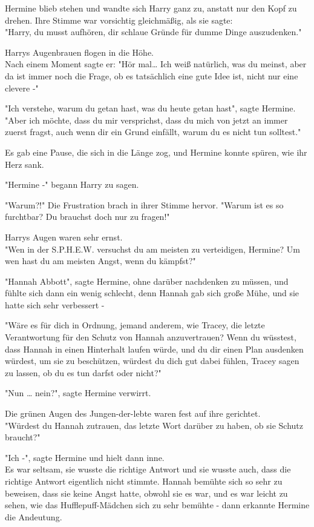 {Hermine blieb stehen und wandte sich Harry ganz zu, anstatt nur den Kopf zu drehen. Ihre Stimme war vorsichtig gleichmäßig, als sie sagte:\\ "Harry, du musst aufhören, dir schlaue Gründe für dumme Dinge auszudenken."

Harrys Augenbrauen flogen in die Höhe.\\ Nach einem Moment sagte er: "Hör mal… Ich weiß natürlich, was du meinst, aber da ist immer noch die Frage, ob es tatsächlich eine gute Idee ist, nicht nur eine clevere -"

"Ich verstehe, warum du getan hast, was du heute getan hast", sagte Hermine. "Aber ich möchte, dass du mir versprichst, dass du mich von jetzt an immer zuerst fragst, auch wenn dir ein Grund einfällt, warum du es nicht tun solltest."

Es gab eine Pause, die sich in die Länge zog, und Hermine konnte spüren, wie ihr Herz sank.

"Hermine -" begann Harry zu sagen.

"Warum?!" Die Frustration brach in ihrer Stimme hervor. "Warum ist es so furchtbar? Du brauchst doch nur zu fragen!"

Harrys Augen waren sehr ernst.\\ "Wen in der S.P.H.E.W. versuchst du am meisten zu verteidigen, Hermine? Um wen hast du am meisten Angst, wenn du kämpfst?"

"Hannah Abbott", sagte Hermine, ohne darüber nachdenken zu müssen, und fühlte sich dann ein wenig schlecht, denn Hannah gab sich große Mühe, und sie hatte sich sehr verbessert -

"Wäre es für dich in Ordnung, jemand anderem, wie Tracey, die letzte Verantwortung für den Schutz von Hannah anzuvertrauen? Wenn du wüsstest, dass Hannah in einen Hinterhalt laufen würde, und du dir einen Plan ausdenken würdest, um sie zu beschützen, würdest du dich gut dabei fühlen, Tracey sagen zu lassen, ob du es tun darfst oder nicht?"

"Nun … nein?", sagte Hermine verwirrt.

Die grünen Augen des Jungen-der-lebte waren fest auf ihre gerichtet.\\ "Würdest du Hannah zutrauen, das letzte Wort darüber zu haben, ob sie Schutz braucht?"

"Ich -", sagte Hermine und hielt dann inne.\\ Es war seltsam, sie wusste die richtige Antwort und sie wusste auch, dass die richtige Antwort eigentlich nicht stimmte. Hannah bemühte sich so sehr zu beweisen, dass sie keine Angst hatte, obwohl sie es war, und es war leicht zu sehen, wie das Hufflepuff-Mädchen sich zu sehr bemühte - dann erkannte Hermine die Andeutung.

}
